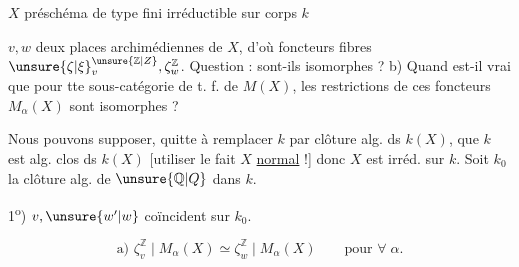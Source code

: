 
$X$  préschéma de type fini  irréductible sur corps $k$

$v,w$ deux places archimédiennes de  $X$, d'où foncteurs fibres $\unsure{\zeta|\xi}^{\unsure{\mathbb{Z}|Z}}_v,\zeta^{\mathbb{Z}}_w$. Question :  sont-ils isomorphes ? b)  Quand est-il vrai que pour tte sous-catégorie  de t. f. de $M(X)$, les restrictions de ces foncteurs  $M_\alpha(X)$ sont isomorphes ?

Nous pouvons supposer, quitte à remplacer $k$ par   clôture alg. ds $k(X)$, que $k$ est alg. clos ds $k(X)$ [utiliser le fait $X$ \uline{normal} !] donc $X$ est  irréd. sur $k$. Soit  $k_0$ la clôture alg. de $\unsure{\mathbb{Q}|Q}$ dans $k$.





1\textsuperscript{o}) $v,\unsure{w'|w}$ coïncident sur $k_0$.

\[
\text{a) }\zeta^{\mathbb{Z}}_v\mid M_\alpha(X)\simeq\zeta^{\mathbb{Z}}_w\mid M_\alpha(X)\qquad\text{pour }\forall\;\alpha.
\]


